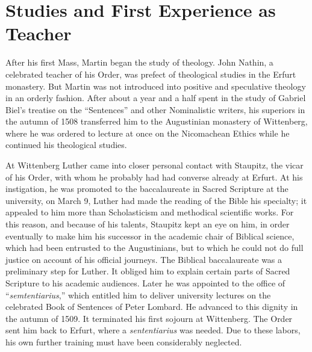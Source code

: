 \section{Studies and First Experience as Teacher}

After his first Mass, Martin began the study of theology. John
Nathin, a celebrated teacher of his Order, was prefect of theological
studies in the Erfurt monastery. But Martin was not introduced
into positive and speculative theology in an orderly fashion. After
about a year and a half spent in the study of Gabriel Biel’s treatise
on the “Sentences” and other Nominalistic writers, his superiors
in the autumn of 1508 transferred him to the Augustinian monastery
of Wittenberg, where he was ordered to lecture at once on the Nicomachean
Ethics while he continued his theological studies.

At Wittenberg Luther came into closer personal contact with
Staupitz, the vicar of his Order, with whom he probably had had
converse already at Erfurt. At his instigation, he was promoted to
the baccalaureate in Sacred Scripture at the university, on March 9,
Luther had made the reading of the Bible his specialty; it appealed
to him more than Scholasticism and methodical scientific
works. For this reason, and because of his talents, Staupitz kept an
eye on him, in order eventually to make him his successor in the
academic chair of Biblical science, which had been entrusted to the
Augustinians, but to which he could not do full justice on account
of his official journeys. The Biblical baccalaureate was a preliminary
step for Luther. It obliged him to explain certain parts of Sacred Scripture
to his academic audiences. Later he was appointed to the
office of “\textit{semtentiarius},” which entitled him to deliver university
lectures on the celebrated Book of Sentences of Peter Lombard.
He advanced to this dignity in the autumn of 1509. It terminated
his first sojourn at Wittenberg. The Order sent him back to Erfurt,
where a \textit{sententiarius} was needed. Due to these labors, his own
further training must have been considerably neglected.

